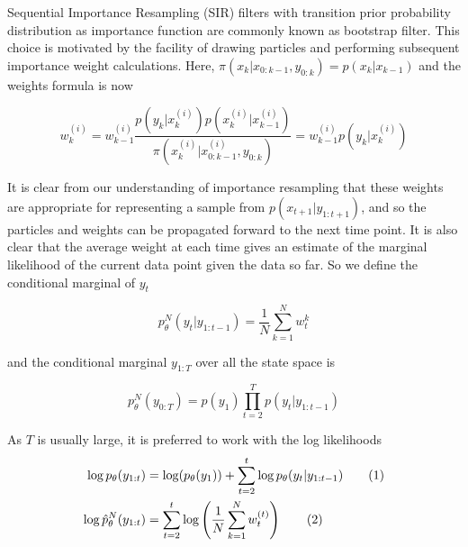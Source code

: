 \documentclass[11pt,a4,twosided,singlespacing,titlepagenumber=on]{scrreprt}
\numberwithin{equation}{chapter} %
\theoremstyle{remark}
\newcommand\numberthis{\addtocounter{equation}{1}\tag{\theequation}}
\begin{document}
Sequential Importance Resampling (SIR) filters with transition prior probability distribution as importance function are commonly known as bootstrap filter. This choice is motivated by the facility of drawing particles and performing subsequent importance weight calculations. Here, $\pi(x_k| x_{0:k-1}, y_{0:k}) = p(x_k|x_{k-1})$ and the weights formula is now

\begin{equation}
w_k^{(i)} = w_{k-1}^{(i)} \frac{p(y_k|x_k^{(i)})p(x_k^{(i)}|x^{(i)}_{k-1})}{\pi(x_k^{(i)}|x^{(i)}_{0:k-1},y_{0:k})}= w_{k-1}^{(i)} p(y_k|x_k^{(i)})
\end{equation}
 


It is clear from our understanding of importance resampling that these weights are appropriate for representing a sample from $p(x_{t+1}|y_{1:t+1})$, and so the particles and weights can be propagated forward to the next time point. It is also clear that the average weight at each time gives an estimate of the marginal likelihood of the current data point given the data so far. So we define the conditional marginal of $y_t$

\begin{equation}
 p^N_{\theta}(y_t | y_{1:t-1}) = \frac{1}{N} \sum_{k=1}^N w_t^k
\end{equation}


and the conditional marginal $y_{1:T}$ over all the state space is

\begin{equation}
 p^N_{\theta}(y_{0:T}) = p(y_1)\prod_{t=2}^T p(y_t | y_{1:t-1})
\end{equation}

As $T$ is usually large, it is preferred to work with the log likelihoods
\begin{align*}
\log p_{\theta}(y_{1:t}) &= \log(p_\theta(y_1)) + \sum_{t=2}^t \log p_\theta(y_t | y_{1:t-1}) \numberthis \\
\log \hat{p}^N_{\theta}(y_{1:t}) &= \sum_{t=2}^t \log \left(\frac{1}{N} \sum_{k=1}^N w_t^{(t)} \right) \numberthis
\end{align*}
\end{document}

